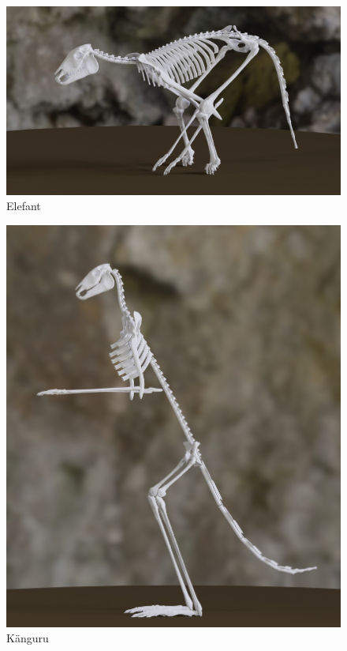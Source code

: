 \documentclass{beamer}
\begin{document}

\begin{frame}[focus]
 \begin{figure}
  \includegraphics[width=\textwidth]{../../java_skeleton_generation/example_skeletons/elefant.jpg}
  \caption{Elefant}
 \end{figure}
\end{frame}

\begin{frame}[focus]
 \begin{figure}
  \includegraphics[height=0.85\textheight]{../../java_skeleton_generation/example_skeletons/kaenguru.jpg}
 \caption{Känguru}
 \end{figure}
\end{frame}
\end{document}
